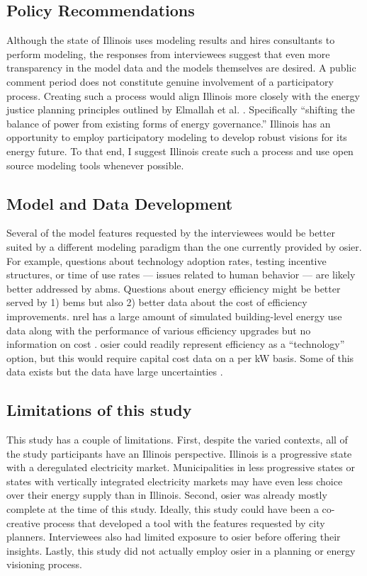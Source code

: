 \subsection{Policy Recommendations}
Although the state of Illinois uses modeling results and hires consultants to
perform modeling, the responses from interviewees suggest that even more
transparency in the model data and the models themselves are desired. A public
comment period does not constitute genuine involvement of a participatory
process. Creating such a process would align Illinois more closely with the
energy justice planning principles outlined by Elmallah et al.
\cite{elmallah_frontlining_2022}. Specifically ``shifting the balance of power
from existing forms of energy governance.'' Illinois has an opportunity to
employ participatory modeling to develop robust visions for its energy future.
To that end, I suggest Illinois create such a process and use open source
modeling tools whenever possible.

\subsection{Model and Data Development}
Several of the model features requested by the interviewees would be better
suited by a different modeling paradigm than the one currently provided by
\ac{osier}. For example, questions about technology adoption rates, testing
incentive structures, or time of use rates --- issues related to human behavior
--- are likely better addressed by \acp{abm}. Questions about energy efficiency
might be better served by 1) \acp{bem} but also 2) better data about the cost of
efficiency improvements. \ac{nrel} has a large amount of simulated building-level energy use data along with the performance of various efficiency upgrades
but no information on cost \cite{wilson_end-use_2022}. \ac{osier} could readily
represent efficiency as a ``technology'' option, but this would require capital
cost data on a per kW basis. Some of this data exists but
the data have large uncertainties \cite{less_cost_2021}.


\subsection{Limitations of this study}
This study has a couple of limitations. First, despite the varied contexts, all
of the study participants have an Illinois perspective. Illinois is a
progressive state with a deregulated electricity market. Municipalities in less
progressive states or states with vertically integrated electricity markets may
have even less choice over their energy supply than in Illinois. Second,
\ac{osier} was already mostly complete at the time of this study. Ideally, this
study could have been a co-creative process that developed a tool with the
features requested by city planners. Interviewees also had limited exposure to
\ac{osier} before offering their insights. Lastly, this study did not actually
employ \ac{osier} in a planning or energy visioning process.